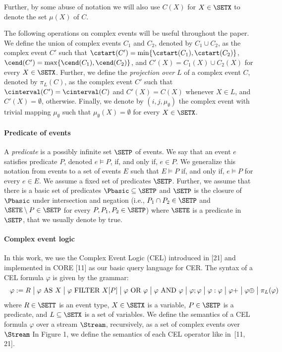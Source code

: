 Further, by some abuse of notation we will also use $C(X)$ for $X \in \SETX$ to denote the set $\mu(X)$ of $C$.

The following operations on complex events will be useful throughout the paper. We define the union of complex events $C_1$ and $C_2$, denoted by $C_1 \cup C_2$, as the complex event $C'$ such that $\cstart(C') = \min\{\cstart(C_1), \cstart(C_2)\}$, $\cend(C') = \max\{\cend(C_1), \cend(C_2)\}$, and $C'(X) = C_1(X) \cup C_2(X)$ for every $X \in \SETX$. Further, we define the \textit{projection over} $L$ of a complex event $C$, denoted by $\pi_L(C)$, as the complex event $C'$ such that $\cinterval(C') = \cinterval(C)$ and $C'(X) = C(X)$ whenever $X \in L$, and $C'(X) = \emptyset$, otherwise. Finally, we denote by $(i, j, \mu_\emptyset)$ the complex event with trivial mapping $\mu_\emptyset$ such that $\mu_\emptyset(X) = \emptyset$ for every $X \in \SETX$.

\paragraph{Predicate of events} A \textit{predicate} is a possibly infinite set $\SETP$ of events. We say that an event $e$ satisfies predicate $P$, denoted $e \vDash P$, if, and only if, $e \in P$. We generalize this notation from events to a set of events $E$ such that $E \vDash P$ if, and only if, $e \vDash P$ for every $e \in E$. We assume a fixed set of predicates $\SETP$. Further, we assume that there is a basic set of predicates $\Pbasic \subseteq \SETP$ and $\SETP$ is the closure of $\Pbasic$ under intersection and negation (i.e., $P_1 \cap P_2 \in \SETP$ and $\SETE \setminus P \in \SETP$ for every $P, P_1, P_2 \in \SETP$) where $\SETE$ is a predicate in $\SETP$, that we usually denote by true.

\paragraph{Complex event logic} In this work, we use the Complex Event Logic (CEL) introduced in [21] and implemented in CORE [11] as our basic query language for CER. The syntax of a CEL formula $\varphi$ is given by the grammar:
\[
\makebox[\textwidth][s]{$
	\varphi := R \; \big|\; \varphi \text{ AS } X 
	\; \big|\; \varphi \text{ FILTER } X[P]
	\; \big|\; \varphi \text{ OR } \varphi
	\; \big|\; \varphi \text{ AND } \varphi
	\; \big|\; \varphi ; \varphi
	\; \big|\; \varphi : \varphi
	\; \big|\; \varphi{+}
	\; \big|\; \varphi{\oplus}
	\; \big|\; \pi_L(\varphi)
	$}
\]
where $R \in \SETT$ is an event type, $X \in \SETX$ is a variable, $P \in \SETP$ is a predicate, and $L \subseteq \SETX$ is a set of variables.  We define the semantics of a CEL formula $\varphi$ over a stream $\Stream$, recursively, as a set of complex events over $\Stream$ In Figure 1, we define the semantics of each CEL operator like in~[11, 21].

